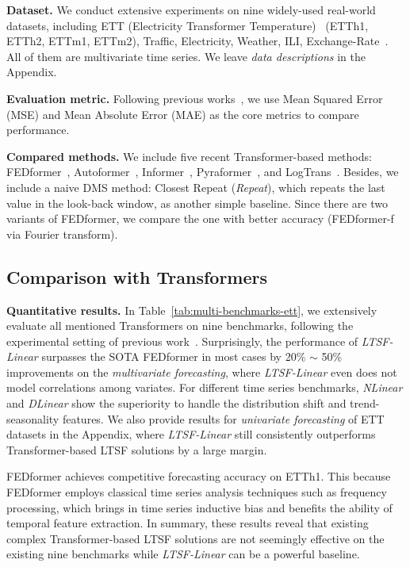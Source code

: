 \documentclass[10pt,twocolumn,letterpaper]{article}
\newcommand{\modelname}{\emph{LTSF-Linear}\xspace}
\begin{document}
\textbf{Dataset.} We conduct extensive experiments on nine widely-used real-world datasets, including ETT (Electricity Transformer Temperature)~\cite{informer} (ETTh1, ETTh2, ETTm1, ETTm2), Traffic, Electricity, Weather, ILI, Exchange-Rate~\cite{GuokunLai2017lstm}. All of them are multivariate time series. We leave \emph{data descriptions} in the Appendix.



\textbf{Evaluation metric.}
Following previous works~\cite{informer,xu2021autoformer,zhou2022fedformer}, we use Mean Squared Error (MSE) and Mean Absolute Error (MAE) as the core metrics to compare performance. 


\textbf{Compared methods.} We include five recent Transformer-based methods: FEDformer~\cite{zhou2022fedformer}, Autoformer~\cite{xu2021autoformer}, Informer~\cite{informer}, Pyraformer~\cite{liu2021pyraformer}, and LogTrans~\cite{li2019LogTrans}. 
Besides, we include a naive DMS method: Closest Repeat (\emph{Repeat}), which repeats the last value in the look-back window, as another simple baseline. Since there are two variants of FEDformer, we compare the one with better accuracy (FEDformer-f via Fourier transform). 



\subsection{Comparison with Transformers}


\textbf{Quantitative results.} In Table~\ref{tab:multi-benchmarks-ett}, we extensively evaluate all mentioned Transformers on nine benchmarks, following the experimental setting of previous work~\cite{xu2021autoformer,zhou2022fedformer,informer}.
Surprisingly, the performance of \modelname surpasses the SOTA FEDformer in most cases by 20\% $\sim$ 50\% improvements on the \emph{multivariate forecasting}, where \modelname even does not model correlations among variates. For different time series benchmarks, \emph{NLinear} and \emph{DLinear} show the superiority to handle the distribution shift and trend-seasonality features.
We also provide results for \emph{univariate forecasting} of ETT datasets in the Appendix, where \modelname still consistently outperforms Transformer-based LTSF solutions by a large margin.


FEDformer achieves competitive forecasting accuracy on ETTh1. This because FEDformer employs classical time series analysis techniques such as frequency processing, which brings in time series inductive bias and benefits the ability of temporal feature extraction. 
In summary, these results reveal that existing complex Transformer-based LTSF solutions are not seemingly effective on the existing nine benchmarks while \modelname can be a powerful baseline. 
\end{document}
